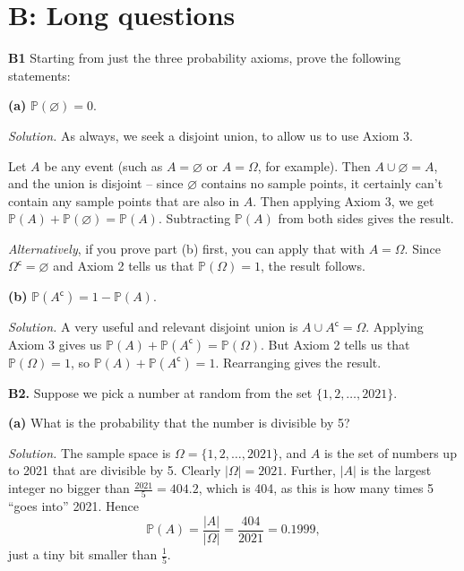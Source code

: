 \documentclass[
  a4paper,
]{book}
\theoremstyle{definition}
\theoremstyle{definition}
\theoremstyle{definition}
\theoremstyle{definition}
\theoremstyle{remark}
\begin{document}
\hypertarget{P2-long}{%
\section*{B: Long questions}\label{P2-long}}

\textbf{B1} Starting from just the three probability axioms, prove the following statements:

\textbf{(a)} \(\mathbb P(\varnothing) = 0\).

\begin{myanswers}
\emph{Solution.} As always, we seek a disjoint union, to allow us to use Axiom 3.

Let \(A\) be any event (such as \(A = \varnothing\) or \(A = \Omega\), for example). Then \(A \cup \varnothing = A\), and the union is disjoint -- since \(\varnothing\) contains no sample points, it certainly can't contain any sample points that are also in \(A\). Then applying Axiom 3, we get \(\mathbb P(A) + \mathbb P(\varnothing) = \mathbb P(A)\). Subtracting \(\mathbb P(A)\) from both sides gives the result.

\emph{Alternatively}, if you prove part (b) first, you can apply that with \(A = \Omega\). Since \(\Omega^\mathsf{c}= \varnothing\) and Axiom 2 tells us that \(\mathbb P(\Omega) = 1\), the result follows.

\end{myanswers}

\textbf{(b)} \(\mathbb P(A^\mathsf{c}) = 1 - \mathbb P(A)\).

\begin{myanswers}
\emph{Solution.} A very useful and relevant disjoint union is \(A \cup A^\mathsf{c}= \Omega\). Applying Axiom 3 gives us \(\mathbb P(A) + \mathbb P(A^\mathsf{c}) = \mathbb P(\Omega)\). But Axiom 2 tells us that \(\mathbb P(\Omega) = 1\), so \(\mathbb P(A) + \mathbb P(A^\mathsf{c}) = 1\). Rearranging gives the result.

\end{myanswers}

\textbf{B2.} Suppose we pick a number at random from the set \(\{1, 2, \dots, 2021\}\).

\textbf{(a)} What is the probability that the number is divisible by 5?

\begin{myanswers}
\emph{Solution.} The sample space is \(\Omega = \{1, 2, \dots, 2021\}\), and \(A\) is the set of numbers up to 2021 that are divisible by 5. Clearly \(|\Omega| = 2021\). Further, \(|A|\) is the largest integer no bigger than \(\frac{2021}{5} = 404.2\), which is 404, as this is how many times 5 ``goes into'' 2021. Hence
\[ \mathbb P(A) = \frac{|A|}{|\Omega|} = \frac{404}{2021} = 0.1999 , \]
just a tiny bit smaller than \(\frac{1}{5}\).

\end{myanswers}
\end{document}
